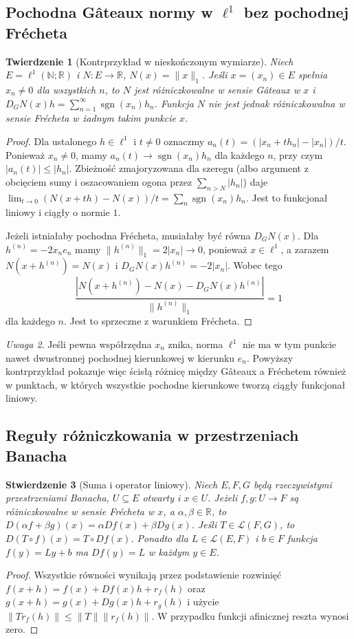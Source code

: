 \documentclass[11pt,a4paper]{article}
\numberwithin{equation}{section}
\theoremstyle{plain}
\newtheorem{twierdzenie}{Twierdzenie}[section]
\newtheorem{stwierdzenie}[twierdzenie]{Stwierdzenie}
\theoremstyle{definition}
\theoremstyle{remark}
\newtheorem{uwaga}[twierdzenie]{Uwaga}
\newcommand{\R}{\mathbb R}
\newcommand{\N}{\mathbb N}
\begin{document}
\subsection{Pochodna Gâteaux normy w \texorpdfstring{$\ell^1$}{ell1} bez pochodnej Frécheta}

\begin{twierdzenie}[Kontrprzykład w nieskończonym wymiarze]
\label{thm:l1-gateaux14}
Niech $E=\ell^1(\N;\R)$ i $N:E\to\R$, $N(x)=\|x\|_1$. Jeśli $x=(x_n)\in E$ spełnia $x_n\ne0$ dla wszystkich $n$, to $N$ jest różniczkowalne w sensie Gâteaux w $x$ i
$D_GN(x)h=\sum_{n=1}^\infty \operatorname{sgn}(x_n)h_n$.
Funkcja $N$ nie jest jednak różniczkowalna w sensie Frécheta w żadnym takim punkcie $x$.
\end{twierdzenie}
\begin{proof}
Dla ustalonego $h\in\ell^1$ i $t\ne0$ oznaczmy $a_n(t)=(|x_n+th_n|-|x_n|)/t$. Ponieważ $x_n\ne0$, mamy $a_n(t)\to\operatorname{sgn}(x_n)h_n$ dla każdego $n$, przy czym $|a_n(t)|\le|h_n|$. Zbieżność zmajoryzowana dla szeregu (albo argument z obcięciem sumy i oszacowaniem ogona przez $\sum_{n>N}|h_n|$) daje
$\lim_{t\to0}(N(x+th)-N(x))/t=\sum_n \operatorname{sgn}(x_n)h_n$.
Jest to funkcjonał liniowy i ciągły o normie $1$.

Jeżeli istniałaby pochodna Frécheta, musiałaby być równa $D_GN(x)$. Dla $h^{(n)}=-2x_ne_n$ mamy $\|h^{(n)}\|_1=2|x_n|\to0$, ponieważ $x\in\ell^1$, a zarazem $N(x+h^{(n)})=N(x)$ i $D_GN(x)h^{(n)}=-2|x_n|$. Wobec tego
\[
\frac{|N(x+h^{(n)})-N(x)-D_GN(x)h^{(n)}|}{\|h^{(n)}\|_1}=1
\]
dla każdego $n$. Jest to sprzeczne z warunkiem Frécheta.
\end{proof}

\begin{uwaga}
Jeśli pewna współrzędna $x_n$ znika, norma $\ell^1$ nie ma w tym punkcie nawet dwustronnej pochodnej kierunkowej w kierunku $e_n$. Powyższy kontrprzykład pokazuje więc ścisłą różnicę między Gâteaux a Fréchetem również w punktach, w których wszystkie pochodne kierunkowe tworzą ciągły funkcjonał liniowy.
\end{uwaga}

\subsection{Reguły różniczkowania w przestrzeniach Banacha}

\begin{stwierdzenie}[Suma i operator liniowy]
\label{prop:sum-linear14}
Niech $E,F,G$ będą rzeczywistymi przestrzeniami Banacha, $U\subseteq E$ otwarty i $x\in U$. Jeżeli $f,g:U\to F$ są różniczkowalne w sensie Frécheta w $x$, a $\alpha,\beta\in\R$, to $D(\alpha f+\beta g)(x)=\alpha Df(x)+\beta Dg(x)$. Jeśli $T\in\mathcal L(F,G)$, to $D(T\circ f)(x)=T\circ Df(x)$. Ponadto dla $L\in\mathcal L(E,F)$ i $b\in F$ funkcja $f(y)=Ly+b$ ma $Df(y)=L$ w każdym $y\in E$.
\end{stwierdzenie}
\begin{proof}
Wszystkie równości wynikają przez podstawienie rozwinięć $f(x+h)=f(x)+Df(x)h+r_f(h)$ oraz $g(x+h)=g(x)+Dg(x)h+r_g(h)$ i użycie $\|Tr_f(h)\|\le\|T\|\|r_f(h)\|$. W przypadku funkcji afinicznej reszta wynosi zero.
\end{proof}
\end{document}
